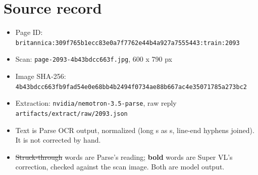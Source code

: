 \documentclass[10pt]{article}
\begin{document}
\section*{Source record}
\begin{itemize}
\item Page ID: \texttt{britannica:309f765b1ecc83e0a7f7762e44b4a927a7555443:train:2093}
\item Scan: \texttt{page-2093-4b43bdcc663f.jpg}, 600 x 790 px
\item Image SHA-256: \texttt{\small 4b43bdcc663fb9fad54e0e68bb4b2494f0734ae88b667ac4e35071785a273bc2}
\item Extraction: \texttt{nvidia/nemotron-3.5-parse}, raw reply \texttt{artifacts/extract/raw/2093.json}
\item Text is Parse OCR output, normalized (long s as s, line-end hyphens joined). It is not corrected by hand.
\item \sout{Struck-through} words are Parse's reading; \textbf{bold} words are Super VL's correction, checked against the scan image. Both are model output.
\end{itemize}
\end{document}
